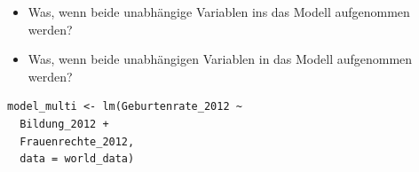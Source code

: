 \documentclass[aspectratio=169, journal, x11names, unknownkeysallowed, hyperref={colorlinks,
linkcolor = SS2,
urlcolor  = F3,
citecolor = F3,
anchorcolor = A4}, 12pt]{beamer}
\begin{document}
  \begin{frame}[t, fragile]
    \begin{minipage}[t]{0.5\textwidth}
        \begin{itemize}
          \item[] Was, wenn beide unabhängige Variablen ins das Modell aufgenommen werden?
        \end{itemize} 

      \end{minipage}%
      \begin{minipage}[t]{0.45\textwidth}
        \vspace{-1em}
        \centering

      \end{minipage}
  \end{frame}

  \begin{frame}[t, fragile]
    \begin{minipage}[t]{0.45\textwidth}
        \begin{itemize}
          \item[] Was, wenn beide unabhängigen Variablen in das Modell aufgenommen werden?
        \end{itemize} 
        \begin{lstlisting}
model_multi <- lm(Geburtenrate_2012 ~ 
  Bildung_2012 + 
  Frauenrechte_2012, 
  data = world_data)        
        \end{lstlisting} 
      \end{minipage}%
      \begin{minipage}[t]{0.45\textwidth}
        \vspace{-1em}
        \centering

      \end{minipage}
  \end{frame}
\end{document}
